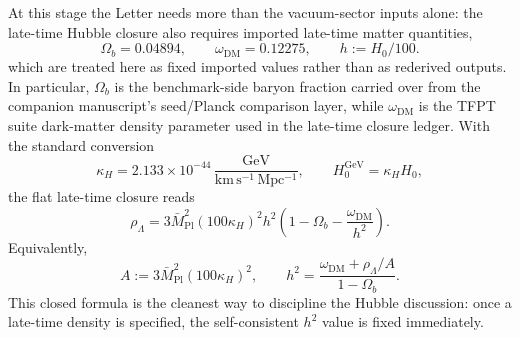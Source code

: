 \documentclass[aps,prl,reprint,superscriptaddress,longbibliography,nofootinbib,floatfix]{revtex4-2}
\newcommand{\Mplred}{\bar M_{\mathrm{Pl}}}
\newcommand{\rhoLambda}{\rho_{\Lambda}}
\newcommand{\omegadm}{\omega_{\mathrm{DM}}}
\begin{document}
At this stage the Letter needs more than the vacuum-sector inputs alone: the late-time Hubble closure also requires imported late-time matter quantities,
\begin{equation}
\Omega_b=0.04894,
\qquad
\omegadm=0.12275,
\qquad
h:=H_0/100.
\label{eq:matter-inputs}
\end{equation}
which are treated here as fixed imported values rather than as rederived outputs. In particular, $\Omega_b$ is the benchmark-side baryon fraction carried over from the companion manuscript's seed/Planck comparison layer, while $\omegadm$ is the TFPT suite dark-matter density parameter used in the late-time closure ledger.
With the standard conversion
\[
\kappa_H=2.133\times10^{-44}\,
\frac{\mathrm{GeV}}{\mathrm{km\,s^{-1}\,Mpc^{-1}}},
\qquad
H_0^{\mathrm{GeV}}=\kappa_H H_0,
\]
the flat late-time closure reads
\begin{equation}
\rhoLambda
=
3\Mplred^2(100\kappa_H)^2h^2
\left(1-\Omega_b-\frac{\omegadm}{h^2}\right).
\label{eq:friedmann}
\end{equation}
Equivalently,
\begin{equation}
A:=3\Mplred^2(100\kappa_H)^2,
\qquad
h^2
=
\frac{\omegadm+\rhoLambda/A}{1-\Omega_b}.
\label{eq:h2-closed}
\end{equation}
This closed formula is the cleanest way to discipline the Hubble discussion: once a late-time density is specified, the self-consistent $h^2$ value is fixed immediately.
\end{document}

